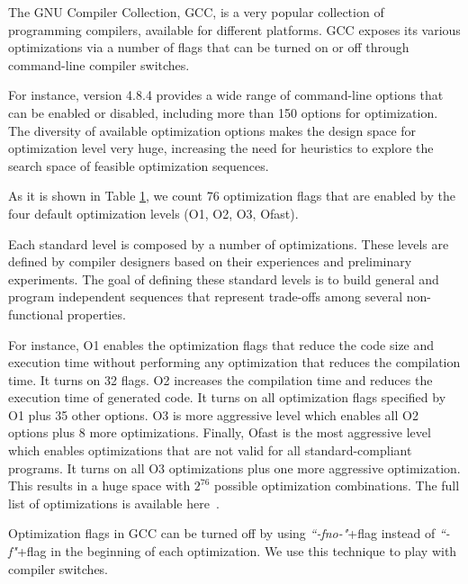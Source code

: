 \begin{table}
{\begin{tabular}[c]{|c|p{7cm}||c|p{7cm}|}
		\end{tabular}
	}
	\label{tab:Compiler optimization options}
	
\end{table}

The GNU Compiler Collection, GCC, is a very popular collection of programming compilers, available for different platforms.
GCC exposes its various optimizations via a number of flags that can be turned on or off through command-line compiler switches. 

For instance, version 4.8.4 provides a wide range of command-line options that can be enabled or disabled, including more than 150 options for optimization. The diversity of available optimization options makes the design space for optimization level very huge, increasing the need for heuristics to explore the search space of feasible optimization sequences.

As it is shown in Table \ref{tab:Compiler optimization options}, we count 76 optimization flags that are enabled by the four default optimization levels (O1, O2, O3, Ofast). 

Each standard level is composed by a number of optimizations. These levels are defined by compiler designers based on their experiences and preliminary experiments. The goal of defining these standard levels is to build general and program independent sequences that represent trade-offs among several non-functional properties.

For instance, O1 enables the optimization flags that reduce the code size and execution time without performing any optimization that reduces the compilation time. It turns on 32 flags. 
O2 increases the compilation time and reduces the execution time of generated code. It turns on all optimization flags specified by O1 plus 35 other options. 
O3 is more aggressive level which enables all O2 options plus 8 more optimizations. 
Finally, Ofast is the most aggressive level which enables optimizations that are not valid for all standard-compliant programs. It turns on all O3 optimizations plus one more aggressive optimization. 
This results in a huge space with $2^{76}$ possible optimization combinations.
The full list of optimizations is available here~\cite{mboussaa}.

Optimization flags in GCC can be turned off by using \textit{``-fno-"}+flag instead of \textit{``-f"}+flag in the beginning of each optimization. 
We use this technique to play with compiler switches.



